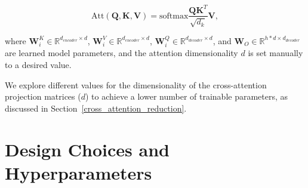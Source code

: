 \documentclass[10pt,twocolumn,letterpaper]{article}
\begin{document}
 \begin{equation}
 \text{Att}(\textbf{Q},\textbf{K},\textbf{V})= \text{softmax}\frac{\textbf{QK}^T}{\sqrt{d_k}}\textbf{V},
 \end{equation}

\noindent where $\textbf{W}_i^K \in \mathbb{R}^{d_{encoder} \times d}$, $\textbf{W}_i^V \in \mathbb{R}^{d_{encoder} \times d}$,  $\textbf{W}_i^Q \in \mathbb{R}^{d_{decoder} \times d}$, and $\textbf{W}_O \in \mathbb{R}^{h*d \times d_{decoder}}$ are learned model parameters, and the attention dimensionality $d$ is set manually to a desired value.

We explore different values for the dimensionality of the cross-attention projection matrices ($d$) to achieve a lower number of trainable parameters, as discussed in Section~\ref{cross_attention_reduction}.





\section{Design Choices and Hyperparameters}
\label{system_dev}
\end{document}
